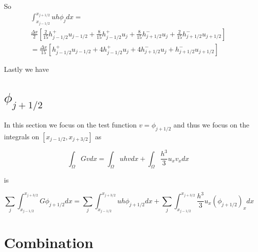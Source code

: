 \documentclass[12pt]{article}
\begin{document}
So 
\begin{multline*}
\int_{x_{j-1/2}}^{x_{j+1/2}}  uh \phi_{j} dx =  \\
\frac{\Delta x}{2} \left[\frac{2}{15} h^+_{j-1/2} u_{j-1/2}  +  \frac{8}{15}h^+_{j-1/2}u_{j}  +
  \frac{8}{15} h^-_{j+1/2} u_{j}  + \frac{2}{15}h^-_{j+1/2} u_{j+1/2}\right] \\ =
\frac{\Delta x}{15} \left[ h^+_{j-1/2} u_{j-1/2}  +  4h^+_{j-1/2}u_{j}  +
  4 h^-_{j+1/2} u_{j}  + h^-_{j+1/2} u_{j+1/2}\right]  
\end{multline*}

Lastly we have 



\section{$\phi_{j+ 1/2} $}

In this section we focus on the test function $v =\phi_{j + 1/2}$ and thus we focus on the integrals on $[x_{j-1/2}, x_{j+3/2}]$ as 

\[\int_\Omega Gv dx = \int_\Omega uhv dx + \int_\Omega\frac{h^3}{3}u_{x}v_xdx\]

is 

\[\sum_{j}\int_{x_{j-1/2}}^{x_{j+3/2}} G\phi_{j+ 1/2} dx = \sum_{j}\int_{x_{j-1/2}}^{x_{j+3/2}}  uh \phi_{j + 1/2} dx + \sum_{j}\int_{x_{j-1/2}}^{x_{j+3/2}} \frac{h^3}{3}u_{x}{(\phi_{j+ 1/2})}_{x}dx\]


\section{Combination}
\end{document}
